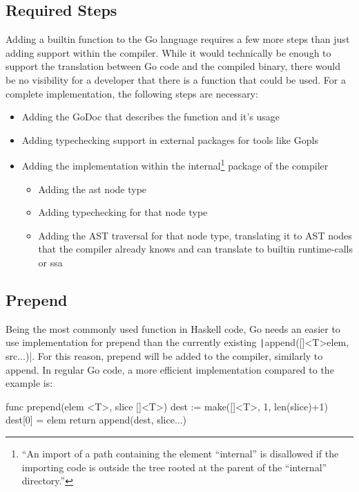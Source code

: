 \subsection{Required Steps}

Adding a builtin function to the Go language requires a few more steps than just adding support
within the compiler. While it would technically be enough to support the translation between
Go code and the compiled binary, there would be no visibility for a developer that there is a
function that could be used.
For a complete implementation, the following steps are necessary:
\begin{itemize}
    \item Adding the GoDoc\cite{godoc} that describes the function and it's usage
    \item Adding typechecking support in external packages for tools like Gopls\cite{gopls}
    \item Adding the implementation within the internal\footnote{
            ``An import of
            a path containing the element “internal” is disallowed if the importing code is
            outside the tree rooted at the parent of the “internal” directory.''\cite{internal-packages}
        }
        package of the compiler
        \begin{itemize}
            \item Adding the \gls{ast} node type
            \item Adding typechecking for that node type
            \item Adding the AST traversal for that node type, translating it
                to AST nodes that the compiler already knows and can translate
                to builtin runtime-calls or \gls{ssa}
        \end{itemize}
\end{itemize}

\subsection{Prepend}

Being the most commonly used function in Haskell code, Go needs an easier to use implementation for prepend
than the currently existing \texttt|append([]<T>{elem}, src...)|.
For this reason, prepend will be added to the compiler, similarly to append.
In regular Go code, a more efficient implementation compared to the example is:
\begin{code}
\label{code:prepend-raw-go}
\begin{gocode}
func prepend(elem <T>, slice []<T>) {
    dest := make([]<T>, 1, len(slice)+1)
    dest[0] = elem
    return append(dest, slice...)
}
\end{gocode}
\end{code}

